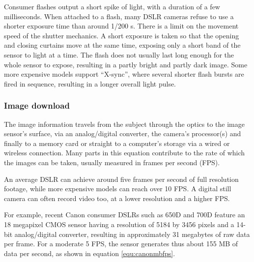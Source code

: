 Consumer flashes output a short spike of light, with a duration of a few milliseconds.
When attached to a flash, many DSLR cameras refuse to use a shorter exposure time than around 1/200 s.
There is a limit on the movement speed of the shutter mechanics.
A short exposure is taken so that the opening and closing curtains move at the same time, exposing only a short band of the sensor to light at a time.
The flash does not usually last long enough for the whole sensor to expose, resulting in a partly bright and partly dark image.
Some more expensive models support ``X-sync'', where several shorter flash bursts are fired in sequence, resulting in a longer overall light pulse.






\subsubsection{Image download} %


The image information travels from the subject through the optics to the image sensor's surface, via an analog/digital converter, the camera's processor(s) and finally to a memory card or straight to a computer's storage via a wired or wireless connection.
Many parts in this equation contribute to the rate of which the images can be taken, usually measured in frames per second (FPS).


An average DSLR can achieve around five frames per second of full resolution footage, while more expensive models can reach over 10 FPS.
A digital still camera can often record video too, at a lower resolution and a higher FPS.


For example, recent Canon consumer DSLRs such as 650D and 700D feature an 18 megapixel CMOS sensor having a resolution of 5184 by 3456 pixels and a 14-bit analog/digital converter, resulting in approximately 31 megabytes of raw data per frame.
For a moderate 5 FPS, the sensor generates thus about 155 MB of data per second, as shown in equation \ref{equ:canonmbfps}.


